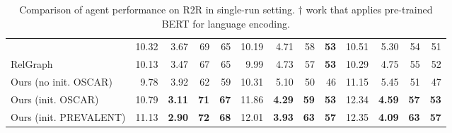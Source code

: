 \documentclass[final]{cvpr}
\newcommand{\high}[1]{{\textbf{\color{blue}#1}}}
\begin{document}
\begin{table*}[t]
\begin{center}
{\begin{tabular}{l|rrrr|rrrr|rrrr}
        & 10.32 & 3.67 & 69 & 65 & 10.19 & 4.71 & 58 & \textbf{53} & 10.51 & 5.30 & 54 & 51 \\
    RelGraph \cite{hong2020graph} 
        & 10.13 & 3.47 & 67 & 65 & 9.99 & 4.73 & 57 & \textbf{53} & 10.29 & 4.75 & 55 & 52 \\
    \hline
    Ours (no init. OSCAR) 
        & 9.78 & 3.92 & 62 & 59 & 10.31 & 5.10 & 50 & 46 & 11.15 & 5.45 & 51 & 47\\
    Ours (init. OSCAR)
        & 10.79 & \textbf{3.11} & \textbf{71} & \textbf{67} & 11.86 & \textbf{4.29} & \textbf{59} & \textbf{53} & 12.34 & \textbf{4.59} & \textbf{57} & \textbf{53} \\
Ours (init. PREVALENT)
        & 11.13 & \high{2.90} & \high{72} & \high{68} & 12.01 & \high{3.93} & \high{63} & \high{57} & 12.35 & \high{4.09} & \high{63} & \high{57} \\
    \hline \hline
  \end{tabular}}
\end{center}
\caption{Comparison of agent performance on R2R in single-run setting. $\dag$ work that applies pre-trained BERT for language encoding.}
\label{tab:table_r2r_result}
\end{table*}
\end{document}
